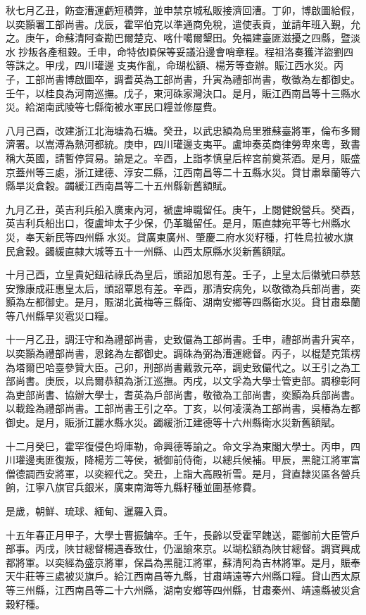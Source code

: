 \begin{pinyinscope}
秋七月乙丑，飭查漕運虧短積弊，並申禁京城私販接濟回漕。丁卯，博啟圖給假，以奕顥署工部尚書。戊辰，霍罕伯克以準通商免稅，遣使表貢，並請年班入覲，允之。庚午，命蘇清阿查勘巴爾楚克、喀什噶爾墾田。免福建臺匪滋擾之四縣，暨淡水抄叛各產租穀。壬申，命特依順保等妥議沿邊會哨章程。程祖洛奏獲洋盜劉四等誅之。甲戌，四川瓘邊支夷作亂，命瑚松額、楊芳等查辦。賑江西水災。丙子，工部尚書博啟圖卒，調耆英為工部尚書，升寅為禮部尚書，敬徵為左都御史。壬午，以桂良為河南巡撫。戊子，東河硃家灣決口。是月，賑江西南昌等十三縣水災。給湖南武陵等七縣衛被水軍民口糧並修屋費。

八月己酉，改建浙江北海塘為石塘。癸丑，以武忠額為烏里雅蘇臺將軍，倫布多爾濟署。以嵩溥為熱河都統。庚申，四川瓘邊支夷平。盧坤奏英商律勞卑來粵，致書稱大英國，請暫停貿易。諭是之。辛酉，上詣孝慎皇后梓宮前奠茶酒。是月，賑盛京蓋州等三處，浙江建德、淳安二縣，江西南昌等二十五縣水災。貸甘肅皋蘭等六縣旱災倉穀。蠲緩江西南昌等二十五州縣新舊額賦。

九月乙丑，英吉利兵船入廣東內河，褫盧坤職留任。庚午，上閱健銳營兵。癸酉，英吉利兵船出口，復盧坤太子少保，仍革職留任。是月，賑直隸宛平等七州縣水災，奉天新民等四州縣水災。貸廣東廣州、肇慶二府水災籽種，打牲烏拉被水旗民倉穀。蠲緩直隸大城等五十一州縣、山西太原縣水災新舊額賦。

十月己酉，立皇貴妃鈕祜祿氏為皇后，頒詔加恩有差。壬子，上皇太后徽號曰恭慈安豫康成莊惠皇太后，頒詔覃恩有差。辛酉，那清安病免，以敬徵為兵部尚書，奕顥為左都御史。是月，賑湖北黃梅等三縣衛、湖南安鄉等四縣衛水災。貸甘肅皋蘭等八州縣旱災雹災口糧。

十一月乙丑，調汪守和為禮部尚書，史致儼為工部尚書。壬申，禮部尚書升寅卒，以奕顥為禮部尚書，恩銘為左都御史。調硃為弼為漕運總督。丙子，以棍楚克策楞為塔爾巴哈臺參贊大臣。己卯，刑部尚書戴敦元卒，調史致儼代之。以王引之為工部尚書。庚辰，以烏爾恭額為浙江巡撫。丙戌，以文孚為大學士管吏部。調穆彰阿為吏部尚書、協辦大學士，耆英為戶部尚書，敬徵為工部尚書，奕顥為兵部尚書。以載銓為禮部尚書。工部尚書王引之卒。丁亥，以何凌漢為工部尚書，吳椿為左都御史。是月，賑浙江麗水縣水災。蠲緩浙江建德等十六州縣衛水災新舊額賦。

十二月癸巳，霍罕復侵色埒庫勒，命興德等諭之。命文孚為東閣大學士。丙申，四川瓘邊夷匪復叛，降楊芳二等侯，褫御前侍衛，以總兵候補。甲辰，黑龍江將軍富僧德調西安將軍，以奕經代之。癸丑，上詣大高殿祈雪。是月，貸直隸災區各營兵餉，江寧八旗官兵銀米，廣東南海等九縣籽種並圍基修費。

是歲，朝鮮、琉球、緬甸、暹羅入貢。

十五年春正月甲子，大學士曹振鏞卒。壬午，長齡以受霍罕餽送，罷御前大臣管戶部事。丙戌，陜甘總督楊遇春致仕，仍溫諭來京。以瑚松額為陜甘總督。調寶興成都將軍。以奕經為盛京將軍，保昌為黑龍江將軍，蘇清阿為吉林將軍。是月，賑奉天牛莊等三處被災旗戶。給江西南昌等九縣，甘肅靖遠等六州縣口糧。貸山西太原等三州縣，江西南昌等二十六州縣，湖南安鄉等四州縣，甘肅秦州、靖遠縣被災倉穀籽種。


\end{pinyinscope}
